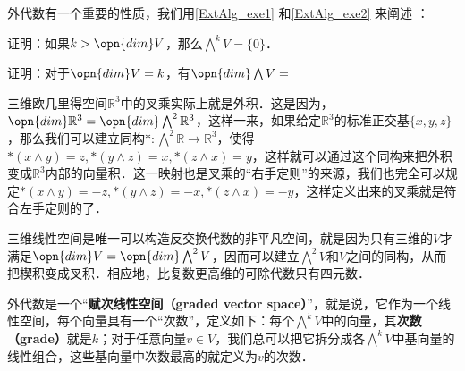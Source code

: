 外代数有一个重要的性质，我们用\autoref{ExtAlg_exe1} 和\autoref{ExtAlg_exe2} 来阐述 ：

\begin{exercise}{}\label{ExtAlg_exe1}
证明：如果$k>\opn{dim} V$，那么$\bigwedge^kV=\{0\}$．
\end{exercise}

\begin{exercise}{}\label{ExtAlg_exe2}
证明：对于$\opn{dim} V=k$，有$\opn{dim} \bigwedge V=$
\end{exercise}




三维欧几里得空间$\mathbb{R}^3$中的叉乘实际上就是外积．这是因为，$\opn{dim}\mathbb{R}^3=\opn{dim}\bigwedge^2\mathbb{R}^3$，这样一来，如果给定$\mathbb{R}^3$的标准正交基$\{x, y, z\}$，那么我们可以建立同构$*: \bigwedge^2\mathbb{R}\rightarrow\mathbb{R}^3$，使得$*(x\wedge y)=z, *(y\wedge z)=x, *(z\wedge x)=y$，这样就可以通过这个同构来把外积变成$\mathbb{R}^3$内部的向量积．这一映射也是叉乘的“右手定则”的来源，我们也完全可以规定$*(x\wedge y)=-z, *(y\wedge z)=-x, *(z\wedge x)=-y$，这样定义出来的叉乘就是符合左手定则的了．

三维线性空间是唯一可以构造反交换代数的非平凡空间，就是因为只有三维的$V$才满足$\opn{dim}V=\opn{dim}\bigwedge^2V$，因而可以建立$\bigwedge^2 V$和$V$之间的同构，从而把楔积变成叉积．相应地，比复数更高维的可除代数只有四元数．

外代数是一个“\textbf{赋次线性空间（graded vector space）}”，就是说，它作为一个线性空间，每个向量具有一个“次数”，定义如下：每个$\bigwedge^kV$中的向量，其\textbf{次数（grade）}就是$k$；对于任意向量$v\in V$，我们总可以把它拆分成各$\bigwedge^kV$中基向量的线性组合，这些基向量中次数最高的就定义为$v$的次数．
